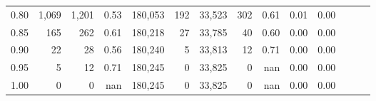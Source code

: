 \begin{tabular}{rrrrrrrrrrrrrr}
0.80 &   1,069 &  1,201 &  0.53 &  180,053 &      192 &  33,523 &     302 &  0.61 &  0.01 &      0.00 \\
0.85 &     165 &    262 &  0.61 &  180,218 &       27 &  33,785 &      40 &  0.60 &  0.00 &      0.00 \\
0.90 &      22 &     28 &  0.56 &  180,240 &        5 &  33,813 &      12 &  0.71 &  0.00 &      0.00 \\
0.95 &       5 &     12 &  0.71 &  180,245 &        0 &  33,825 &       0 &   nan &  0.00 &      0.00 \\
1.00 &       0 &      0 &   nan &  180,245 &        0 &  33,825 &       0 &   nan &  0.00 &      0.00 \\
\bottomrule
\end{tabular}

